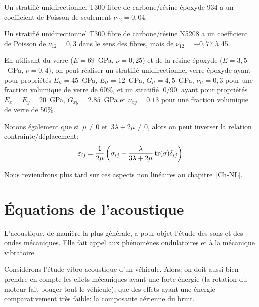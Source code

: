 Un stratifié unidirectionnel T300 fibre de carbone/résine époxyde 934 a un coefficient de Poisson de seulement $\nu_{12}=0,04$.

Un stratifié unidirectionnel T300 fibre de carbone/résine N5208 a un coefficient de Poisson de $\nu_{12}=0,3$ dans le sens des fibres, mais de $\nu_{12}=-0,77$ à 45\degres.

En utilisant du verre ($E=69$~GPa, $\nu=0,25$) et de la résine époxyde ($E=3,5$~GPa, $\nu=0,4$), on peut réaliser un stratifié unidirectionnel verre-époxyde ayant pour propriétés $E_{ll}=45$~GPa, $E_{tt}=12$~GPa, $G_{lt}=4,5$~GPa, $\nu_{lt}=0,3$ pour une fraction volumique de verre de 60\%, et un stratifié [0/90] ayant pour propriétés $E_x=E_y=20$~GPa, $G_{xy}=2.85$~GPa et $\nu_{xy}=0.13$ pour une fraction volumique de verre de 50\%.


\medskip
Notons également que si~$\mu\ne0$ et~$3\lambda+2\mu\ne0$, alors on peut inverser la
relation contrainte/dé\-pla\-ce\-ment:
\begin{equation}
\varepsilon_{ij}=\dfrac1{2\mu}\left(\sigma_{ij}-\dfrac\lambda{3\lambda+2\mu}\operatorname{tr}(\sigma)\delta_{ij}\right)
\end{equation}

\medskip
Nous reviendrons plus tard sur ces aspects non linéaires au chapitre~\ref{Ch-NL}.


\medskip
\section{Équations de l'acoustique}\label{Sec-EqAcou}
L'acoustique, de manière la plus générale, a pour objet l'étude des sons et des ondes mécaniques.  Elle fait appel aux phénomènes ondulatoires et à la mécanique vibratoire.

Considérons l'étude vibro-acoustique d'un véhicule. Alors, on doit aussi bien prendre en compte les effets mécaniques ayant une forte énergie (la rotation du moteur fait bouger tout le véhicule), que des effets ayant une énergie comparativement très faible: la composante aérienne du bruit. 

